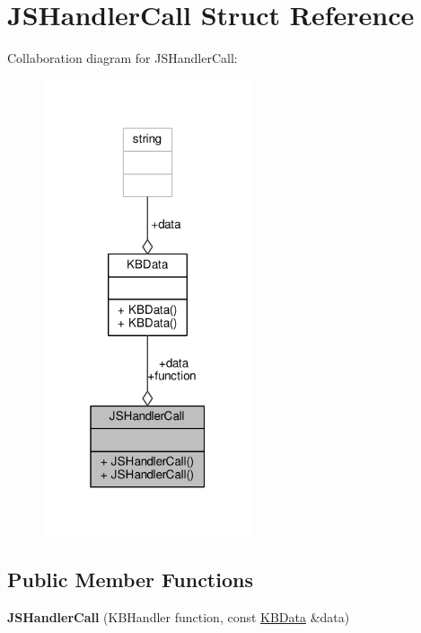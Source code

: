 \hypertarget{structJSHandlerCall}{}\section{J\+S\+Handler\+Call Struct Reference}
\label{structJSHandlerCall}


Collaboration diagram for J\+S\+Handler\+Call\+:
\nopagebreak
\begin{figure}[H]
\begin{center}
\leavevmode
\includegraphics[width=175pt]{d3/df1/structJSHandlerCall__coll__graph}
\end{center}
\end{figure}
\subsection*{Public Member Functions}
\begin{DoxyCompactItemize}
\item 
{\bfseries J\+S\+Handler\+Call} (K\+B\+Handler function, const \hyperlink{classKBData}{K\+B\+Data} \&data)\hypertarget{structJSHandlerCall_aaceb1cc0741f32e987e6aee663aa51be}{}\label{structJSHandlerCall_aaceb1cc0741f32e987e6aee663aa51be}

\end{DoxyCompactItemize}
